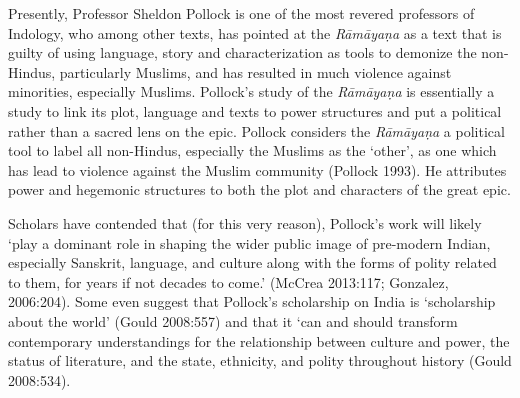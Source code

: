 Presently, Professor Sheldon Pollock is one of the most revered professors of Indology, who among other texts, has pointed at the \textit{Rāmāyaṇa} as a text that is guilty of using language, story and characterization as tools to demonize the non-Hindus, particularly Muslims, and has resulted in much violence against minorities, especially Muslims. Pollock’s study of the \textit{Rāmāyaṇa} is essentially a study to link its plot, language and texts to power structures and put a political rather than a sacred lens on the epic. Pollock considers the \textit{Rāmāyaṇa} a political tool to label all non-Hindus, especially the Muslims as the ‘other’, as one which has lead to violence against the Muslim community (Pollock 1993). He attributes power and hegemonic structures to both the plot and characters of the great epic.

Scholars have contended that (for this very reason), Pollock’s work will likely ‘play a dominant role in shaping the wider public image of pre-modern Indian, especially Sanskrit, language, and culture along with the forms of polity related to them, for years if not decades to come.’ (McCrea 2013:117; Gonzalez, 2006:204). Some even suggest that Pollock’s scholarship on India is ‘scholarship about the world’ (Gould 2008:557) and that it ‘can and should transform contemporary understandings for the relationship between culture and power, the status of literature, and the state, ethnicity, and polity throughout history (Gould 2008:534).

